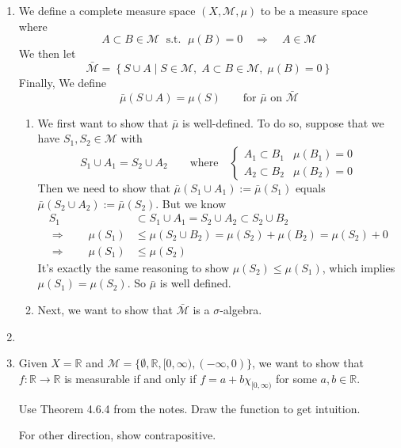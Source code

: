 \documentclass[12pt]{article}
\theoremstyle{plain}
\theoremstyle{definition}
\theoremstyle{remark}
\begin{document}
\begin{enumerate}
\newpage
\item We define a complete measure space $(X,\mathscr{M}, \mu)$ to be a measure space where 
\[
    A\subset B\in\mathscr{M} \; \text{ s.t. }\;\mu(B)=0 
    \quad\Rightarrow\quad A\in\mathscr{M}
\]
We then let 
\[
    \bar{\mathscr{M}} = \left\{ S\cup A \; | \;  
        S\in\mathscr{M}, \; A\subset B\in\mathscr{M}, \;  
        \mu(B)=0
    \right\}
\]
Finally, We define 
\[
    \bar{\mu}(S\cup A) = \mu(S)  \qquad 
    \text{for $\bar{\mu}$ on $\bar{\mathscr{M}}$}
\]
\begin{enumerate}
\item We first want to show that $\bar{\mu}$ is well-defined. To do so, suppose that we have $S_1, S_2\in\mathscr{M}$ with 
\[
    S_1 \cup A_1 = S_2 \cup A_2 
    \qquad \text{where} \quad
    \begin{cases}
    A_1 \subset B_1 &\mu(B_1) = 0\\ A_2 \subset B_2 &\mu(B_2) = 0
    \end{cases}
\]
Then we need to show that $\bar{\mu}(S_1\cup A_1):=\bar{\mu}(S_1)$ equals $\bar{\mu}(S_2\cup A_2):=\bar{\mu}(S_2)$. But we know
\begin{align*}
    S_1 &\subset S_1 \cup A_1 = S_2 \cup A_2 \subset 
        S_2 \cup B_2 \\
    \Rightarrow \qquad
    \mu(S_1) &\leq 
        \mu(S_2 \cup B_2) = \mu(S_2) + \mu(B_2) = 
        \mu(S_2) + 0 \\
    \Rightarrow \qquad
        \mu(S_1) &\leq 
        \mu(S_2)
\end{align*}
It's exactly the same reasoning to show $\mu(S_2) \leq \mu(S_1)$, which implies $\mu(S_1) = \mu(S_2)$. So $\bar{\mu}$ is well defined.

\item Next, we want to show that $\bar{\mathscr{M}}$ is a $\sigma$-algebra. 

\end{enumerate}


\item 
\item Given $X=\mathbb{R}$ and $\mathscr{M} = \{\emptyset, \mathbb{R}, [0,\infty), (-\infty,0)\}$, we want to show that $f:\mathbb{R}\rightarrow\mathbb{R}$ is measurable if and only if $f=a+b\chi_{[0,\infty)}$ for some $a,b\in\mathbb{R}$.
    
    Use Theorem 4.6.4 from the notes. Draw the function to get intuition.

For other direction, show contrapositive.


\end{enumerate}
\end{document}
